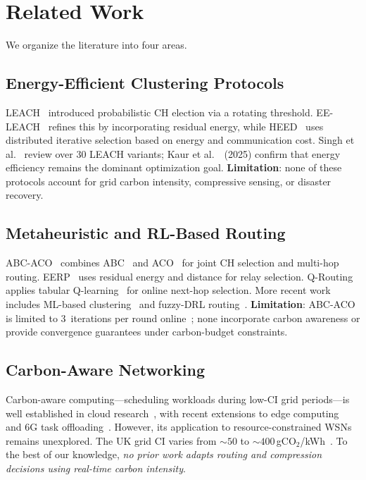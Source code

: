 \documentclass[12pt, onecolumn, journal]{IEEEtran}
\begin{document}
\section{Related Work}
\label{sec:related}

We organize the literature into four areas.

\subsection{Energy-Efficient Clustering Protocols}
LEACH~\cite{heinzelman2000leach} introduced probabilistic CH election via a rotating threshold.
EE-LEACH~\cite{bakaraniya2013eeleach} refines this by incorporating residual energy, while HEED~\cite{younis2004heed} uses distributed iterative selection based on energy and communication cost.
Singh et al.~\cite{singh2017survey} review over 30 LEACH variants; Kaur et al.~\cite{kaur2025energy}~(2025) confirm that energy efficiency remains the dominant optimization goal.
\textbf{Limitation}: none of these protocols account for grid carbon intensity, compressive sensing, or disaster recovery.

\subsection{Metaheuristic and RL-Based Routing}
ABC-ACO~\cite{elkhediri2024abcaco} combines ABC~\cite{karaboga2007abc} and ACO~\cite{dorigo2004ant} for joint CH selection and multi-hop routing.
EERP~\cite{biswas2018eerp} uses residual energy and distance for relay selection.
Q-Routing~\cite{boyan1994qrouting} applies tabular Q-learning~\cite{watkins1992qlearning} for online next-hop selection.
More recent work includes ML-based clustering~\cite{akram2025eemlcr} and fuzzy-DRL routing~\cite{wang2025fuzzy_drl}.
\textbf{Limitation}: ABC-ACO is limited to 3~iterations per round online~\cite{kuila2014abc_wsn}; none incorporate carbon awareness or provide convergence guarantees under carbon-budget constraints.

\subsection{Carbon-Aware Networking}
Carbon-aware computing---scheduling workloads during low-CI grid periods---is well established in cloud research~\cite{urgaonkar2011green, freitag2021ict}, with recent extensions to edge computing~\cite{huynh2025carbon_dt} and 6G task offloading~\cite{navaprakash2026carbon}.
However, its application to resource-constrained WSNs remains unexplored.
The UK grid CI varies from ${\sim}50$ to ${\sim}400$\,gCO$_2$/kWh~\cite{uk_carbon_api, ember2024}.
To the best of our knowledge, \emph{no prior work adapts routing and compression decisions using real-time carbon intensity}.
\end{document}

